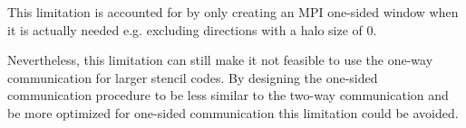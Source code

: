 This limitation is accounted for by only creating an MPI one-sided window when it is actually needed e.g. excluding directions with a halo size of 0.

Nevertheless, this limitation can still make it not feasible to use the one-way communication for larger stencil codes.
By designing the one-sided communication procedure to be less similar to the two-way communication and be more optimized for one-sided communication this limitation could be avoided.


